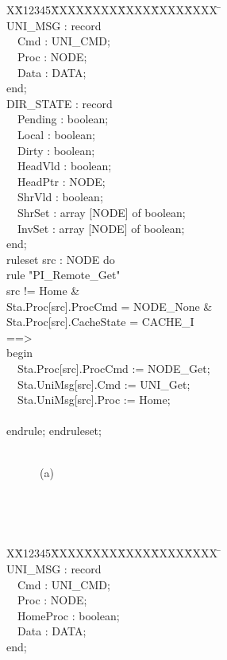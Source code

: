 \documentclass{llncs}
\newlength{\fminilength}
\newenvironment{fmini}[1][\linewidth]
  {\setlength{\fminilength}{#1\fboxsep-2\fboxrule}%
   \vspace{2ex}\noindent\begin{lrbox}{\fminibox}\begin{minipage}{\fminilength}%
   \mbox{ }\hfill\vspace{-2.5ex}}%
  {\end{minipage}\end{lrbox}\vspace{1ex}\hspace{0ex}%
   \framebox{\usebox{\fminibox}}}
\newenvironment{specification}
{\noindent\scriptsize
\tt\begin{fmini}\begin{tabbing}X\=X12345\=XXXX\=XXXX\=XXXX\=XXXX\=XXXX
\=\+\kill} {\end{tabbing}\normalfont\end{fmini}}
\def \twoSpaces {\ \ }
\def \twoSpaces {\ \ }
\begin{document}
\begin{multicols}{2}
\begin{specification}\\
 UNI\_MSG : record\\
\twoSpaces    Cmd : UNI\_CMD;\\
\twoSpaces     Proc : NODE;\\
\twoSpaces     Data : DATA;\\
  end;\\

 DIR\_STATE : record\\
\twoSpaces     Pending : boolean;\\
\twoSpaces     Local : boolean;\\
\twoSpaces     Dirty : boolean;\\
\twoSpaces     HeadVld : boolean;\\
\twoSpaces     HeadPtr : NODE;\\
\twoSpaces     ShrVld : boolean;\\
\twoSpaces     ShrSet : array [NODE] of boolean;\\
\twoSpaces     InvSet : array [NODE] of boolean;\\
  end;  \\

  ruleset src : NODE do\\
rule "PI\_Remote\_Get"\\
  src != Home \&\\
  Sta.Proc[src].ProcCmd = NODE\_None \&\\
  Sta.Proc[src].CacheState = CACHE\_I\\
==>\\

begin\\
\twoSpaces    Sta.Proc[src].ProcCmd := NODE\_Get;\\
\twoSpaces    Sta.UniMsg[src].Cmd := UNI\_Get;\\
\twoSpaces    Sta.UniMsg[src].Proc := Home;\\\\
endrule;
endruleset;\\
\end{specification}\\
\twoSpaces \twoSpaces \twoSpaces \center(a)
\columnbreak

\begin{specification}\\
UNI\_MSG : record\\
\twoSpaces     Cmd : UNI\_CMD;\\
\twoSpaces    Proc : NODE;\\
\twoSpaces     HomeProc : boolean;\\
\twoSpaces     Data : DATA;\\
  end;\\



\end{specification}
\end{multicols}
\end{document}
